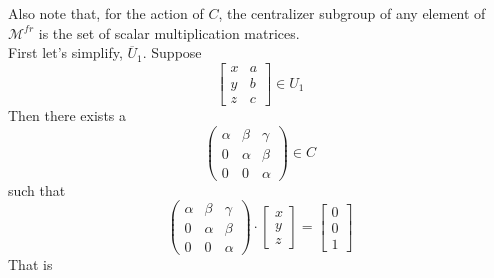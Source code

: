 \begin{example}
Also note that, for the action of $C$, the centralizer subgroup of any element of $\mathcal{M}^{fr}$ is the set of scalar multiplication matrices.\\
First let's simplify, $\overline{U}_1$. Suppose
\[
	\begin{bmatrix}
	x&a\\
	y&b\\
	z&c
	\end{bmatrix}
	\in U_1
\]
Then there exists a 
\[
	\begin{pmatrix}
		\alpha & \beta & \gamma \\
		0 & \alpha & \beta \\
		0 & 0 & \alpha	
	\end{pmatrix}
	\in
	C
\]
such that
\[
	\begin{pmatrix}
		\alpha & \beta & \gamma \\
		0 & \alpha & \beta \\
		0 & 0 & \alpha	
	\end{pmatrix}
	\cdot
	\begin{bmatrix}
		x\\
		y\\
		z
	\end{bmatrix}
	=
	\begin{bmatrix}
		0\\
		0\\
		1
	\end{bmatrix}	
\] 
That is 


\end{example}
